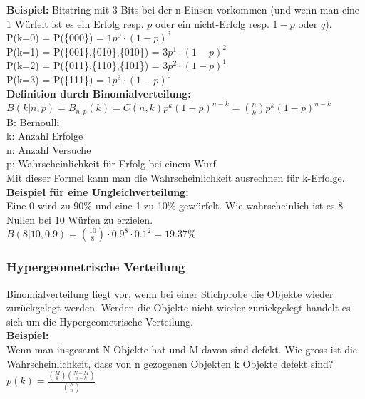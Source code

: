 \documentclass[12pt]{scrartcl}
\begin{document}
\textbf{Beispiel:}
Bitstring mit 3 Bits bei der n-Einsen vorkommen (und wenn man eine 1 Würfelt ist es ein
Erfolg resp. $p$ oder ein nicht-Erfolg resp. $1-p$ oder $q$).\\

P(k=0) = P(\{000\}) = $1p^0 \cdot (1-p)^3$\\
P(k=1) = P(\{001\},\{010\},\{010\}) = $3p^1 \cdot (1-p)^2$\\
P(k=2) = P(\{011\},\{110\},\{101\}) = $3p^2 \cdot (1-p)^1$\\
P(k=3) = P(\{111\}) = $1p^3 \cdot (1-p)^0$\\

\textbf{Definition durch Binomialverteilung:}\\
$B(k|n,p) = B_{n,p}(k) = C(n,k)p^k(1-p)^{n-k} = \binom{n}{k}p^k(1-p)^{n-k}$\\
B: Bernoulli\\
k: Anzahl Erfolge\\
n: Anzahl Versuche\\
p: Wahrscheinlichkeit für Erfolg bei einem Wurf\\

Mit dieser Formel kann man die Wahrscheinlichkeit ausrechnen für k-Erfolge.\\


\textbf{Beispiel für eine Ungleichverteilung:}\\
Eine 0 wird zu 90\% und eine 1 zu 10\% gewürfelt. Wie wahrscheinlich ist es 8 Nullen bei
10 Würfen zu erzielen.\\

$B(8|10,0.9) = \binom{10}{8} \cdot 0.9^8 \cdot 0.1^2 = 19.37\%$

\subsubsection{Hypergeometrische Verteilung}
Binomialverteilung liegt vor, wenn bei einer Stichprobe die Objekte wieder zurückgelegt werden.
Werden die Objekte nicht wieder zurückgelegt handelt es sich um die Hypergeometrische Verteilung.\\

\textbf{Beispiel:}\\
Wenn man insgesamt N Objekte hat und M davon sind defekt. Wie gross ist die Wahrscheinlichkeit,
dass von n gezogenen Objekten k Objekte defekt sind?\\

$\displaystyle{p(k) = \frac{\binom{M}{k} \binom{N-M}{n-k}}{\binom{N}{n}}}$\\
\vspace{1cm}
\end{document}
